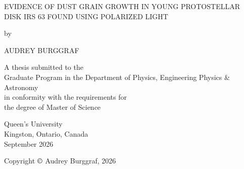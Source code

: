 \begin{titlepage}
    \begin{center}
            
       

        \large \uppercase{
        {Evidence of Dust Grain Growth in Young Protostellar Disk IRS 63 Found Using Polarized Light }}

        \vspace{1.5cm}

        by
            
        \vspace{1.5cm}
            
        \large{\uppercase{Audrey Burggraf}}
            
        \vspace{1.5cm}
            
        \normalsize A thesis submitted to the \\
        Graduate Program in the Department of Physics, Engineering Physics \& Astronomy \\
        in conformity with the requirements for \\
        the degree of Master of Science
            
        \vspace{1.0cm}
            
            
        
        Queen's University\\
        Kingston, Ontario, Canada\\
        September 2026

        \vspace{1.0cm}

        Copyright $\copyright$ Audrey Burggraf, 2026
            
    \end{center}
\end{titlepage}